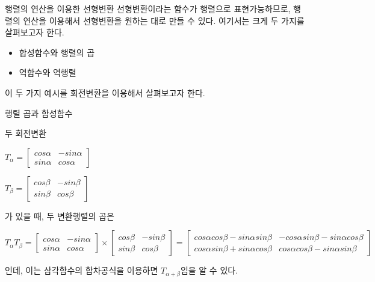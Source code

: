 \documentclass{beamer}
\begin{document}
\begin{frame}{행렬의 연산을 이용한 선형변환}
선형변환이라는 함수가 행렬으로 표현가능하므로, 행렬의 연산을 이용해서 선형변환을 원하는 대로 만들 수 있다. 여기서는 크게 두 가지를 살펴보고자 한다. 

\begin{itemize} 
\item 합성함수와 행렬의 곱 
\item 역함수와 역행렬
\end{itemize}

이 두 가지 예시를 회전변환을 이용해서 살펴보고자 한다. 

\end{frame}

\begin{frame}{행렬 곱과 함성함수} 

두 회전변환 

$T_{\alpha} = 
\left[ \begin{matrix}
cos \alpha & - sin \alpha  \\
sin \alpha & cos \alpha 
\end{matrix} \right] $

$T_{\beta} = 
\left[ \begin{matrix}
cos \beta & - sin \beta  \\
sin \beta & cos \beta 
\end{matrix} \right] $

가 있을 때, 두 변환행렬의 곱은 


$T_{\alpha} T_{\beta}  = 
\left[ \begin{matrix}
cos \alpha & - sin \alpha  \\
sin \alpha & cos \alpha 
\end{matrix} \right] \times 
\left[ \begin{matrix}
cos \beta & - sin \beta  \\
sin \beta & cos \beta 
\end{matrix} \right] = 
\left[ \begin{matrix}
cos \alpha cos \beta - sin \alpha sin \beta  & - cos \alpha sin \beta - sin \alpha cos \beta  \\
cos \alpha sin \beta + sin \alpha cos \beta  & cos \alpha cos \beta - sin \alpha sin \beta
\end{matrix} \right] 
 $
 
인데, 이는 삼각함수의 합차공식을 이용하면 $T_{\alpha + \beta}$임을 알 수 있다. 

\end{frame}
\end{document}
